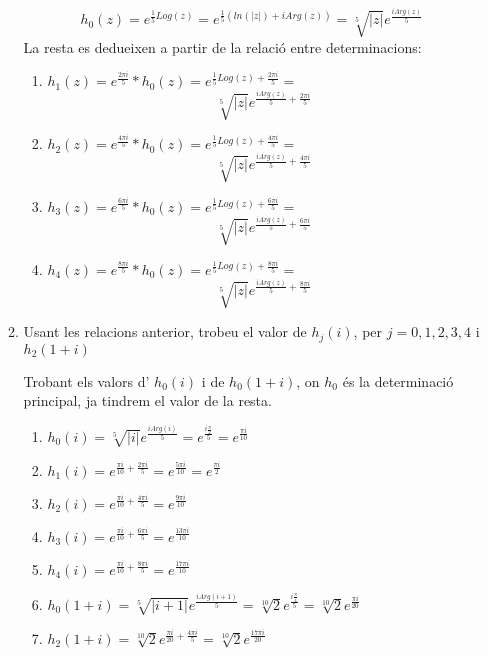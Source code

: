 \documentclass[10pt,a4paper]{article}
\begin{document}
\begin{enumerate}
\begin{enumerate}
\begin{framed}
	$$h_{0}(z) = e^{\frac{1}{5}Log(z)} = e^{\frac{1}{5}(ln(|z|) + iArg(z))} = \sqrt[5]{|z|}e^{\frac{iArg(z)}{5}}$$
	La resta es dedueixen a partir de la relació entre determinacions:
	\begin{enumerate}
		\item $h_{1}(z) = e^{\frac{2\pi i}{5}} * h_{0}(z) = e^{\frac{1}{5}Log(z) + \frac{2\pi i}{5}} =$
		$$\sqrt[5]{|z|}e^{\frac{iArg(z)}{5} + \frac{2\pi i}{5}}$$
		\item $h_{2}(z) = e^{\frac{4\pi i}{5}} * h_{0}(z) = e^{\frac{1}{5}Log(z) + \frac{4\pi i}{5}} =$
		$$\sqrt[5]{|z|}e^{\frac{iArg(z)}{5} + \frac{4\pi i}{5}}$$
		\item $h_{3}(z) = e^{\frac{6\pi i}{5}} * h_{0}(z) = e^{\frac{1}{5}Log(z) + \frac{6\pi i}{5}} =$ 
		$$\sqrt[5]{|z|}e^{\frac{iArg(z)}{5} + \frac{6\pi i}{5}}$$
		\item $h_{4}(z) = e^{\frac{8\pi i}{5}} * h_{0}(z) = e^{\frac{1}{5}Log(z) + \frac{8\pi i}{5}} =$
		$$\sqrt[5]{|z|}e^{\frac{iArg(z)}{5} + \frac{8\pi i}{5}}$$
	\end{enumerate}
	\end{framed}
	\item Usant les relacions anterior, trobeu el valor de $h_{j}(i)$, per $j = 0,1,2,3,4$ i $h_{2}(1+i)$
	\begin{framed}
	Trobant els valors d' $h_{0}(i)$ i de $h_{0}(1+i)$, on $h_{0}$ és la determinació principal, ja tindrem el valor de la resta.
	\begin{enumerate}
		\item $h_{0}(i) = \sqrt[5]{|i|}e^{\frac{iArg(i)}{5}} = e^{\frac{i\frac{\pi}{2}}{5}} = e^{\frac{\pi i}{10}} $
		\item $h_{1}(i) = e^{\frac{\pi i}{10} + \frac{2\pi i}{5}} = e^{\frac{5\pi i}{10}} = e^{\frac{\pi i}{2}}$
		\item $h_{2}(i) = e^{\frac{\pi i}{10} + \frac{4\pi i}{5}} = e^{\frac{9\pi i}{10}}$
		\item $h_{3}(i) = e^{\frac{\pi i}{10} + \frac{6\pi i}{5}} = e^{\frac{13\pi i}{10}}$
		\item $h_{4}(i) = e^{\frac{\pi i}{10} + \frac{8\pi i}{5}} = e^{\frac{17\pi i}{10}}$
		\item $h_{0}(1+i) = \sqrt[5]{|i+1|}e^{\frac{iArg(i+1)}{5}} = \sqrt[10]{2}e^{\frac{i\frac{\pi}{4}}{5}} = \sqrt[10]{2}e^{\frac{\pi i}{20}}$
		\item $h_{2}(1+i) = \sqrt[10]{2}e^{\frac{\pi i}{20} + \frac{4\pi i}{5}} 
		= \sqrt[10]{2}e^{\frac{17\pi i}{20}}$
	\end{enumerate}	 
	\end{framed}
		
	\end{enumerate}
		
\end{enumerate}
\end{document}

